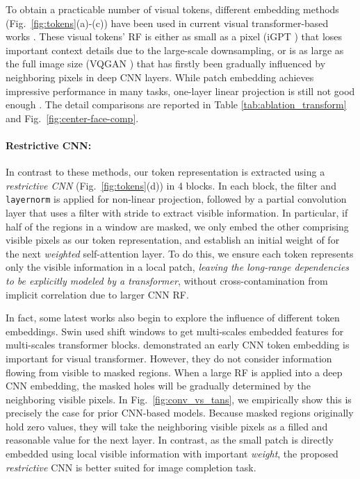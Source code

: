 \documentclass[10pt,twocolumn,letterpaper]{article}
\begin{document}
To obtain a practicable number of visual tokens, different embedding methods (Fig.\ \ref{fig:tokens}(a)-(c)) have been used in current visual transformer-based works \cite{dosovitskiy2020image,carion2020end,zhu2020deformable,esser2020taming,chen2020generative,hudson2021gansformer,jiang2021transgan,wu2020visual,SETR,Wan_2021_ICCV}. These visual tokens' RF is either as small as a pixel (\eg iGPT \cite{chen2020generative}) that loses important context details due to the large-scale downsampling, or is as large as the full image size (\eg VQGAN \cite{esser2020taming}) that has firstly been gradually influenced by neighboring pixels in deep CNN layers. While patch embedding \cite{dosovitskiy2020image} achieves impressive performance in many tasks, one-layer linear projection is still not good enough \cite{xiao2021early}. The detail comparisons are reported in Table \ref{tab:ablation_transform} and Fig.\ \ref{fig:center-face-comp}.  

\vspace{-0.2cm}\paragraph{Restrictive CNN:} In contrast to these methods, our token representation is extracted using a \emph{restrictive CNN} (Fig.~\ref{fig:tokens}(d)) in 4 blocks. In each block, the  filter and \texttt{layernorm} is applied for non-linear projection, followed by a partial convolution layer \cite{Liu_2018_ECCV} that uses a  filter with stride  to extract visible information. In particular, if half of the regions in a window are masked, we only embed the other  comprising visible pixels as our token representation, and establish an initial weight of  for the next \emph{weighted} self-attention layer. To do this, we ensure each token represents only the visible information in a local patch, \emph{leaving the long-range dependencies to be explicitly modeled by a transformer}, without cross-contamination from implicit correlation due to larger CNN RF. 

In fact, some latest works also begin to explore the influence of different token embeddings. Swin \cite{liu2021Swin} used shift windows to get multi-scales embedded features for multi-scales transformer blocks.  \cite{xiao2021early} demonstrated an early CNN token embedding is important for visual transformer. However, they do not consider information flowing from visible to masked regions. When a large RF is applied into a deep CNN embedding, the masked holes will be gradually determined by the neighboring visible pixels. In Fig.\ \ref{fig:conv_vs_tans}, we empirically show this is precisely the case for prior CNN-based models. Because masked regions originally hold zero values, they will take the neighboring visible pixels as a filled and reasonable value for the next layer. In contrast, as the small patch is directly embedded using local visible information with important \emph{weight}, the proposed \emph{restrictive} CNN is better suited for image completion task. 
\end{document}
